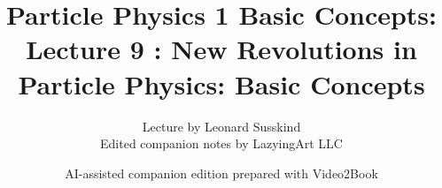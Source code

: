 \documentclass[11pt,oneside]{book}
\begin{document}
\frontmatter
\title{Particle Physics 1 Basic Concepts: Lecture 9 : New Revolutions in Particle Physics: Basic Concepts}
\author{Lecture by Leonard Susskind\\Edited companion notes by LazyingArt LLC}
\date{AI-assisted companion edition prepared with Video2Book}
\maketitle
\clearpage
\mainmatter

\end{document}
